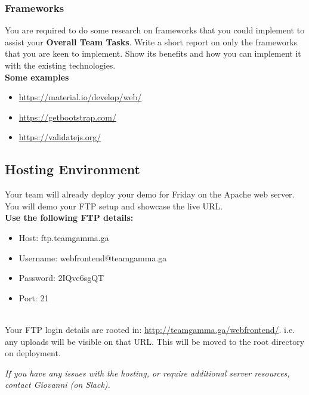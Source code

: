 \documentclass{article}
\begin{document}
\newpage
\subsubsection{Frameworks}
You are required to do some research on frameworks that you could implement to assist your \textbf{Overall Team Tasks}. Write a short report on only the frameworks that you are keen to implement. Show its benefits and how you can implement it with the existing technologies. \\

\textbf{Some examples}
\begin{itemize}
    \item \url{https://material.io/develop/web/}
    \item \url{https://getbootstrap.com/}
    \item \url{https://validatejs.org/}
\end{itemize}

\subsection{Hosting Environment}
Your team will already deploy your demo for Friday on the Apache web server. You will demo your FTP setup and showcase the live URL.\\

\textbf{Use the following FTP details:} 

\begin{itemize}
\begin{itemize}
\item Host: ftp.teamgamma.ga
\item Username: webfrontend@teamgamma.ga
\item Password: 2IQve6sgQT
\item Port: 21
\end{itemize}
\end{itemize}

\\

Your FTP login details are rooted in: \url{http://teamgamma.ga/webfrontend/}. i.e. any uploads will be visible on that URL. This will be moved to the root directory on deployment.

\begin{center}
   \textit{If you have any issues with the hosting, or require additional server resources, contact Giovanni (on Slack).}
\end{center}

\newpage
\end{document}
